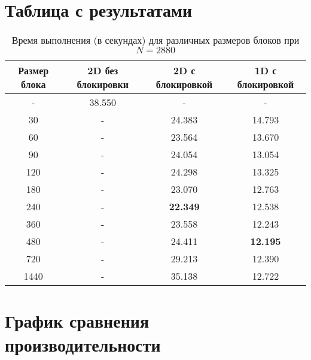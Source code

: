 \documentclass[14pt, russian]{matmex-diploma-custom}
\begin{document}
\section{Таблица с результатами}
\begin{table}[h!]
    \centering
    \caption{Время выполнения (в секундах) для различных размеров блоков при $N = 2880$}
    \begin{tabular}{@{}cccc@{}}
    \toprule
    \textbf{Размер блока} & \textbf{2D без блокировки} & \textbf{2D с блокировкой} & \textbf{1D с блокировкой} \\ \midrule
    -     & 38.550  & -       & -       \\
    30    & -       & 24.383  & 14.793  \\
    60    & -       & 23.564  & 13.670  \\
    90    & -       & 24.054  & 13.054  \\
    120   & -       & 24.298  & 13.325  \\
    180   & -       & 23.070  & 12.763  \\
    240   & -       & \textbf{22.349}  & 12.538  \\
    360   & -       & 23.558  & 12.243  \\
    480   & -       & 24.411  & \textbf{12.195}  \\
    720   & -       & 29.213  & 12.390  \\
    1440  & -       & 35.138  & 12.722  \\
    \bottomrule
    \end{tabular}
\end{table}

\vspace{1cm}
\section{График сравнения производительности}
\end{document}

